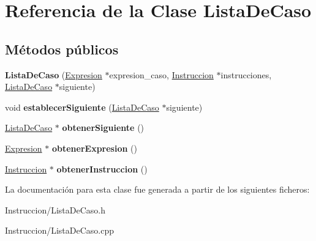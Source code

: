 \hypertarget{class_lista_de_caso}{\section{Referencia de la Clase Lista\-De\-Caso}
\label{class_lista_de_caso}
}
\subsection*{Métodos públicos}
\begin{DoxyCompactItemize}
\item 
\hypertarget{class_lista_de_caso_a4c4ec9e45d5a4d218795a65fe3afb35d}{{\bfseries Lista\-De\-Caso} (\hyperlink{class_expresion}{Expresion} $\ast$expresion\-\_\-caso, \hyperlink{class_instruccion}{Instruccion} $\ast$instrucciones, \hyperlink{class_lista_de_caso}{Lista\-De\-Caso} $\ast$siguiente)}\label{class_lista_de_caso_a4c4ec9e45d5a4d218795a65fe3afb35d}

\item 
\hypertarget{class_lista_de_caso_a9c6f0e007b19ce9f78be90af19a721a5}{void {\bfseries establecer\-Siguiente} (\hyperlink{class_lista_de_caso}{Lista\-De\-Caso} $\ast$siguiente)}\label{class_lista_de_caso_a9c6f0e007b19ce9f78be90af19a721a5}

\item 
\hypertarget{class_lista_de_caso_a09a6d396f80986bdab579b450ed5b59a}{\hyperlink{class_lista_de_caso}{Lista\-De\-Caso} $\ast$ {\bfseries obtener\-Siguiente} ()}\label{class_lista_de_caso_a09a6d396f80986bdab579b450ed5b59a}

\item 
\hypertarget{class_lista_de_caso_af5a5edca34cef6d795891a1e06c47731}{\hyperlink{class_expresion}{Expresion} $\ast$ {\bfseries obtener\-Expresion} ()}\label{class_lista_de_caso_af5a5edca34cef6d795891a1e06c47731}

\item 
\hypertarget{class_lista_de_caso_abe3ca7dd4a4589ce04201a0546d97888}{\hyperlink{class_instruccion}{Instruccion} $\ast$ {\bfseries obtener\-Instruccion} ()}\label{class_lista_de_caso_abe3ca7dd4a4589ce04201a0546d97888}

\end{DoxyCompactItemize}


La documentación para esta clase fue generada a partir de los siguientes ficheros\-:\begin{DoxyCompactItemize}
\item 
Instruccion/Lista\-De\-Caso.\-h\item 
Instruccion/Lista\-De\-Caso.\-cpp\end{DoxyCompactItemize}
